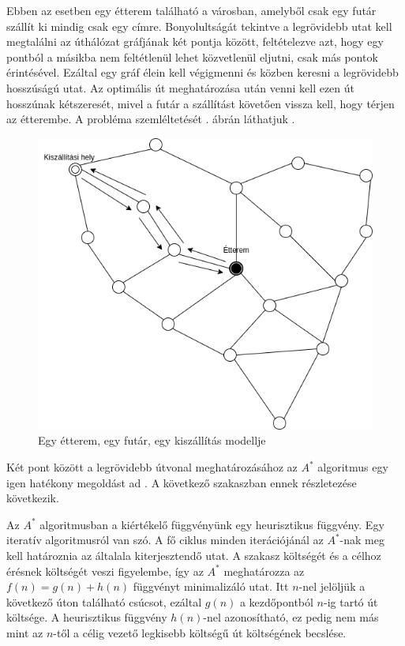 

Ebben az esetben egy étterem található a városban, amelyből csak egy futár szállít ki mindig csak egy címre.
Bonyolultságát tekintve a legrövidebb utat kell megtalálni az úthálózat gráfjának két pontja között, feltételezve azt, hogy egy pontból a másikba nem feltétlenül lehet közvetlenül eljutni, csak más pontok érintésével. Ezáltal egy gráf élein kell végigmenni és közben keresni a legrövidebb hosszúságú utat. Az optimális út meghatározása után venni kell ezen út hosszúnak kétszeresét, mivel a futár a szállítást követően vissza kell, hogy térjen az étterembe.
A probléma szemléltetését . ábrán láthatjuk \cite{Diagrams.net}.

\begin{figure}[h!]
\centering
\includegraphics[scale=0.5]{images/Astar.png}
\caption{Egy étterem, egy futár, egy kiszállítás modellje}
\label{fig:model1}
\end{figure}

Két pont között a legrövidebb útvonal meghatározásához az $A^{*}$ algoritmus egy igen hatékony megoldást ad \cite{Astar}.
A következő szakaszban ennek részletezése következik.


Az $A^{*}$ algoritmusban a kiértékelő függvényünk egy heurisztikus függvény.
Egy iteratív algoritmusról van szó.
A fő ciklus minden iterációjánál az $A^{*}$-nak meg kell határoznia az általala kiterjesztendő utat.
A szakasz költségét és a célhoz érésnek költségét veszi figyelembe, így az $A^{*}$ meghatározza az $f(n) = g(n) + h(n)$ függvényt minimalizáló utat. Itt $n$-nel jelöljük a következő úton található csúcsot, ezáltal $g(n)$ a kezdőpontból $n$-ig tartó út költsége. A heurisztikus függvény $h(n)$-nel azonosítható, ez pedig nem más mint az $n$-től a célig vezető legkisebb költségű út költségének becslése.

